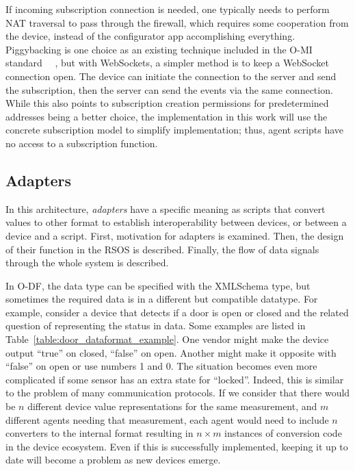 If incoming subscription connection is needed, one typically needs to perform NAT traversal to pass through the firewall, which requires some cooperation from the device, instead of the configurator app accomplishing everything. Piggybacking is one choice as an existing technique included in the O-MI standard ~\cite{o-mi}~\cite{A_standardized_approach_to_deal_with_firewall_and_mobility_policies_in_the_IoT}, but with WebSockets, a simpler method is to keep a WebSocket connection open. The device can initiate the connection to the server and send the subscription, then the server can send the events via the same connection.  While this also points to subscription creation permissions for predetermined addresses being a better choice, the implementation in this work will use the concrete subscription model to simplify implementation; thus, agent scripts have no access to a subscription function.

\subsection{Adapters}

In this architecture, \emph{adapters} have a specific meaning as scripts that convert values to other format to establish interoperability between devices, or between a device and a script. First, motivation for adapters is examined. Then, the design of their function in the RSOS is described. Finally, the flow of data signals through the whole system is described.

In O-DF, the data type can be specified with the XMLSchema type, %
but sometimes the required data is in a different but compatible datatype. For example, consider a device that detects if a door is open or closed and the related question of representing the status in data. Some examples are listed in Table~\ref{table:door_dataformat_example}. One vendor might make the device output ``true'' on closed, ``false'' on open. Another might make it opposite with ``false'' on open or use numbers 1 and 0. The situation becomes even more complicated if some sensor has an extra state for ``locked''. Indeed, this is similar to the problem of many communication protocols. If we consider that there would be $n$ different device value representations for the same measurement, and $m$ different agents needing that measurement, each agent would need to include $n$ converters to the internal format resulting in $n \times m$ instances of conversion code in the device ecosystem. Even if this is successfully implemented, keeping it up to date will become a problem as new devices emerge. 

